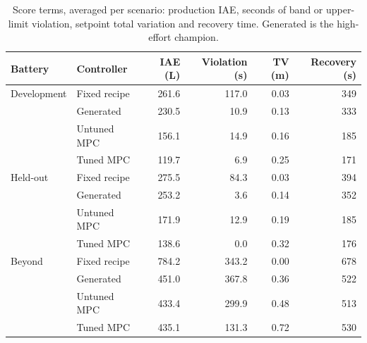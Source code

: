 \begin{table}[tb]
  \centering
  \caption{Score terms, averaged per scenario: production IAE, seconds of
    band or upper-limit violation, setpoint total variation and recovery
    time. Generated is the high-effort champion.}
  \label{tab:coord-metrics}
  \small
  \begin{tabular}{@{}llrrrr@{}}
    \toprule
    Battery & Controller & IAE (L) & Violation (s) & TV (m) & Recovery (s) \\
    \midrule
    Development & Fixed recipe & 261.6 & 117.0 & 0.03 & 349 \\
                & Generated    & 230.5 &  10.9 & 0.13 & 333 \\
                & Untuned MPC  & 156.1 &  14.9 & 0.16 & 185 \\
                & Tuned MPC    & 119.7 &   6.9 & 0.25 & 171 \\
    \midrule
    Held-out    & Fixed recipe & 275.5 &  84.3 & 0.03 & 394 \\
                & Generated    & 253.2 &   3.6 & 0.14 & 352 \\
                & Untuned MPC  & 171.9 &  12.9 & 0.19 & 185 \\
                & Tuned MPC    & 138.6 &   0.0 & 0.32 & 176 \\
    \midrule
    Beyond      & Fixed recipe & 784.2 & 343.2 & 0.00 & 678 \\
                & Generated    & 451.0 & 367.8 & 0.36 & 522 \\
                & Untuned MPC  & 433.4 & 299.9 & 0.48 & 513 \\
                & Tuned MPC    & 435.1 & 131.3 & 0.72 & 530 \\
    \bottomrule
  \end{tabular}
\end{table}

